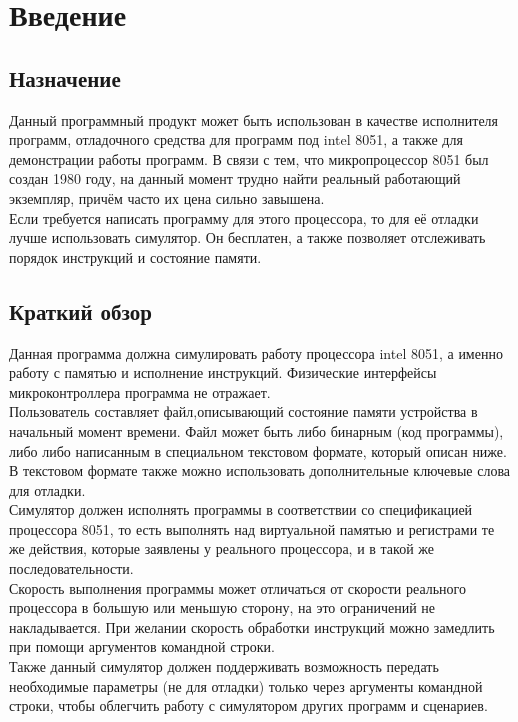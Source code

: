 





\large



\tableofcontents
\newpage


\section{Введение}
\subsection{Назначение}
Данный программный продукт может быть использован в качестве исполнителя программ, отладочного средства для программ под intel 8051, а также для демонстрации работы программ. В связи с тем, что микропроцессор 8051 был создан 1980 году, на данный момент трудно найти реальный работающий экземпляр, причём часто их цена сильно завышена.\\
Если требуется написать программу для этого процессора, то для её отладки лучше использовать симулятор. Он бесплатен, а также позволяет отслеживать порядок инструкций и состояние памяти.\\
\subsection{Краткий обзор}
Данная программа должна симулировать работу процессора intel 8051, а именно работу с памятью и исполнение инструкций. Физические интерфейсы микроконтроллера программа не отражает.\\
Пользователь составляет файл,описывающий состояние памяти устройства в начальный момент времени. Файл может быть либо бинарным (код программы), либо либо написанным в специальном текстовом формате, который описан ниже. В текстовом формате также можно использовать дополнительные ключевые слова для отладки.\\
Симулятор должен исполнять программы в соответствии со спецификацией процессора 8051, то есть выполнять над виртуальной памятью и регистрами те же действия, которые заявлены у реального процессора, и в такой же последовательности. \\
Скорость выполнения программы может отличаться от скорости реального процессора в большую или меньшую сторону, на это ограничений не накладывается.
При желании скорость обработки инструкций можно замедлить при помощи аргументов командной строки. \\
Также данный симулятор должен поддерживать возможность передать необходимые параметры (не для отладки) только через аргументы командной строки, чтобы облегчить работу с симулятором других программ и сценариев.
